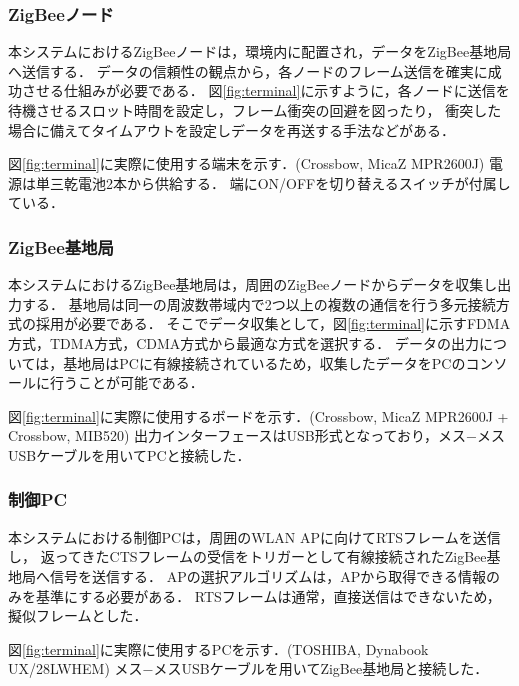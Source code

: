\documentclass[12pt]{jreport}
\begin{document}
\subsubsection{ZigBeeノード}

本システムにおけるZigBeeノードは，環境内に配置され，データをZigBee基地局へ送信する．
データの信頼性の観点から，各ノードのフレーム送信を確実に成功させる仕組みが必要である．
図\ref{fig:terminal}に示すように，各ノードに送信を待機させるスロット時間を設定し，フレーム衝突の回避を図ったり，
衝突した場合に備えてタイムアウトを設定しデータを再送する手法などがある．

図\ref{fig:terminal}に実際に使用する端末を示す．(Crossbow, MicaZ MPR2600J)
電源は単三乾電池2本から供給する．
端にON/OFFを切り替えるスイッチが付属している．

\subsubsection{ZigBee基地局}

本システムにおけるZigBee基地局は，周囲のZigBeeノードからデータを収集し出力する．
基地局は同一の周波数帯域内で2つ以上の複数の通信を行う多元接続方式の採用が必要である．
そこでデータ収集として，図\ref{fig:terminal}に示すFDMA方式，TDMA方式，CDMA方式から最適な方式を選択する．
データの出力については，基地局はPCに有線接続されているため，収集したデータをPCのコンソールに行うことが可能である．

図\ref{fig:terminal}に実際に使用するボードを示す．(Crossbow, MicaZ MPR2600J + Crossbow, MIB520)
出力インターフェースはUSB形式となっており，メス−メスUSBケーブルを用いてPCと接続した．

\subsubsection{制御PC}

本システムにおける制御PCは，周囲のWLAN APに向けてRTSフレームを送信し，
返ってきたCTSフレームの受信をトリガーとして有線接続されたZigBee基地局へ信号を送信する．
APの選択アルゴリズムは，APから取得できる情報のみを基準にする必要がある．
RTSフレームは通常，直接送信はできないため，擬似フレームとした．

図\ref{fig:terminal}に実際に使用するPCを示す．(TOSHIBA, Dynabook UX/28LWHEM)
メス−メスUSBケーブルを用いてZigBee基地局と接続した．
\end{document}
